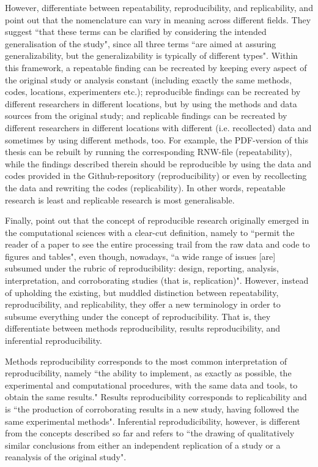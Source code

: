 \documentclass[11pt, a4paper,twoside]{report}\usepackage[]{graphicx}\usepackage[]{color}
\begin{document}
However, \cite{kenett2015clarifying} differentiate between repeatability, reproducibility, and replicability, and point out that the nomenclature can vary in meaning across different fields. They suggest ``that these terms can be clarified by considering the intended generalisation of the study", since all three terms ``are aimed at assuring generalizability, but the generalizability is typically of different types". Within this framework, a repeatable finding can be recreated by keeping every aspect of the original study or analysis constant (including exactly the same methods, codes, locations, experimenters etc.); reproducible findings can be recreated by different researchers in different locations, but by using the methods and data sources from the original study; and replicable findings can be recreated by different researchers in different locations with different (i.e. recollected) data and sometimes by using different methods, too. For example, the PDF-version of this thesis can be rebuilt by running the corresponding RNW-file (repeatability), while the findings described therein should be reproducible by using the data and codes provided in the Github-repository (reproducibility) or even by recollecting the data and rewriting the codes (replicability). In other words, repeatable research is least and replicable research is most generalisable.

Finally, \cite{goodman_what_2016} point out that the concept of reproducible research originally emerged in the computational sciences with a clear-cut definition, namely to ``permit the reader of a paper to see the entire processing trail from the raw data and code to figures and tables", even though, nowadays, ``a wide range of issues [are] subsumed under the rubric of reproducibility: design, reporting, analysis, interpretation, and corroborating studies (that is, replication)". However, instead of upholding the existing, but muddled distinction between repeatability, reproducibility, and replicability, they offer a new terminology in order to subsume everything under the concept of reproducibility. That is, they differentiate between methods reproducibility, results reproducibility, and inferential reproducibility. 

Methods reproducibility corresponds to the most common interpretation of reproducibility, namely ``the ability to implement, as exactly as possible, the experimental and computational procedures, with the same data and tools, to obtain the same results." Results reproducibility corresponds to replicability and is ``the production of corroborating results in a new study, having followed the same experimental methods". Inferential reprodudicibility, however, is different from the concepts described so far and refers to ``the drawing of qualitatively similar conclusions from either an independent replication of a study or a reanalysis of the original study".
\end{document}

